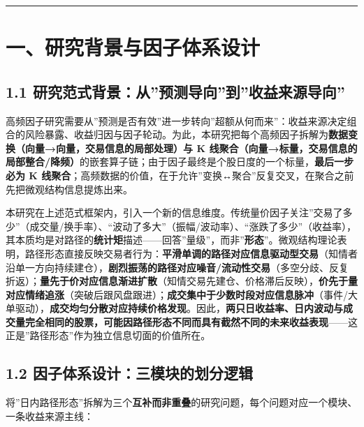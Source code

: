\documentclass[UTF8,a4paper,zihao=-4,fontset=windows]{ctexart}
\begin{document}
\begin{center}\rule{0.5\linewidth}{0.5pt}\end{center}

\section{一、研究背景与因子体系设计}\label{ux4e00ux7814ux7a76ux80ccux666fux4e0eux56e0ux5b50ux4f53ux7cfbux8bbeux8ba1}

\subsection{1.1
研究范式背景：从''预测导向''到''收益来源导向''}\label{ux7814ux7a76ux8303ux5f0fux80ccux666fux4eceux9884ux6d4bux5bfcux5411ux5230ux6536ux76caux6765ux6e90ux5bfcux5411}

高频因子研究需要从''预测是否有效''进一步转向''超额从何而来''：收益来源决定组合的风险暴露、收益归因与因子轮动。为此，本研究把每个高频因子拆解为\textbf{数据变换（向量→向量，交易信息的局部处理）与
K
线聚合（向量→标量，交易信息的局部整合/降频）}的嵌套算子链；由于因子最终是个股日度的一个标量，\textbf{最后一步必为
K
线聚合}；高频数据的价值，在于允许''变换↔聚合''反复交叉，在聚合之前先把微观结构信息提炼出来。

本研究在上述范式框架内，引入一个新的信息维度。传统量价因子关注''交易了多少''（成交量/换手率）、``波动了多大''（振幅/波动率）、``涨跌了多少''（收益率），其本质均是对路径的\textbf{统计矩}描述------回答''量级''，而非''\textbf{形态}''。微观结构理论表明，路径形态直接反映交易者行为：\textbf{平滑单调的路径对应信息驱动型交易}（知情者沿单一方向持续建仓），\textbf{剧烈振荡的路径对应噪音/流动性交易}（多空分歧、反复折返）；\textbf{量先于价对应信息渐进扩散}（知情交易先建仓、价格滞后反映），\textbf{价先于量对应情绪追涨}（突破后跟风盘跟进）；\textbf{成交集中于少数时段对应信息脉冲}（事件/大单驱动），\textbf{成交均匀分散对应持续价格发现}。因此，\textbf{两只日收益率、日内波动与成交量完全相同的股票，可能因路径形态不同而具有截然不同的未来收益表现}------这正是''路径形态''作为独立信息切面的价值所在。

\subsection{1.2
因子体系设计：三模块的划分逻辑}\label{ux56e0ux5b50ux4f53ux7cfbux8bbeux8ba1ux4e09ux6a21ux5757ux7684ux5212ux5206ux903bux8f91}

将''日内路径形态''拆解为三个\textbf{互补而非重叠}的研究问题，每个问题对应一个模块、一条收益来源主线：
\end{document}
